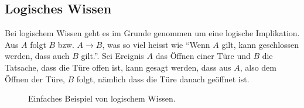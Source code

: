 \subsection{Logisches Wissen}
\label{subsec:logisches_wissen}

Bei logischem Wissen geht es im Grunde genommen um eine logische Implikation. Aus $A$ folgt $B$ bzw. $A \to B$, was so viel heisst wie ``Wenn $A$ gilt, kann geschlossen werden, dass auch $B$ gilt.''. Sei Ereignis $A$ das Öffnen einer Türe und $B$ die Tatsache, dass die Türe offen ist, kann gesagt werden, dass aus $A$, also dem Öffnen der Türe, $B$ folgt, nämlich dass die Türe danach geöffnet ist.

\begin{figure}[htbp]
\centering {}
\caption{Einfaches Beispiel von logischem Wissen.\label{fig:experten_systeme_prozedurales_wissen}\protect\footnotemark}
\end{figure}

